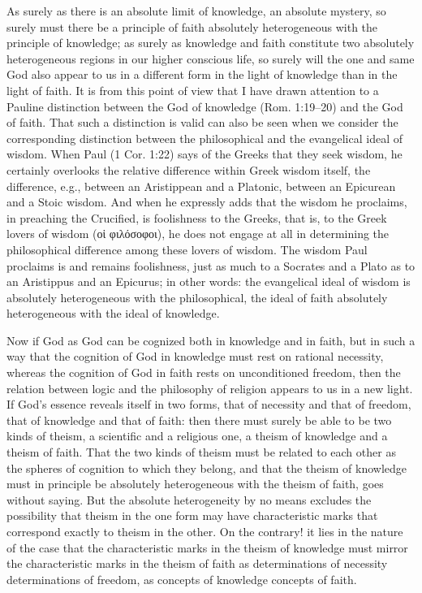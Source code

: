 \documentclass[12pt]{book}
\newcommand{\opage}[1]{\marginnote{\footnotesize\textit{[#1]}}}
\begin{document}
As surely as there is an absolute limit of knowledge, an absolute mystery, so surely must there be a principle of faith
\opage{135}\setcounter{footnote}{0}%
absolutely heterogeneous with the principle of knowledge; as surely as knowledge and faith constitute two absolutely heterogeneous regions in our higher conscious life, so surely will the one and same God also appear to us in a different form in the light of knowledge than in the light of faith. It is from this point of view that I have drawn attention to a Pauline distinction between the God of knowledge (Rom. 1:19--20) and the God of faith. That such a distinction is valid can also be seen when we consider the corresponding distinction between the philosophical and the evangelical ideal of wisdom. When Paul (1 Cor. 1:22) says of the Greeks that they seek wisdom, he certainly overlooks the relative difference within Greek wisdom itself, the difference, e.g., between an Aristippean and a Platonic, between an Epicurean and a Stoic wisdom. And when he expressly adds that the wisdom he proclaims, in preaching the Crucified, is foolishness to the Greeks, that is, to the Greek lovers of wisdom (οἱ φιλόσοφοι), he does not engage at all in determining the philosophical difference among these lovers of wisdom. The wisdom Paul proclaims is and remains foolishness, just as much to a Socrates and a Plato as to an Aristippus and an Epicurus; in other words: the evangelical ideal of wisdom is absolutely heterogeneous with the philosophical, the ideal of faith absolutely heterogeneous with the ideal of knowledge.

Now if God as God can be cognized both in knowledge and in faith, but in such a way that the cognition of God in knowledge must rest on rational necessity, whereas the cognition of God in faith rests on unconditioned freedom, then the relation between logic and the philosophy of religion appears to us in a new light. If God's essence reveals itself in two forms, that of necessity and that of freedom, that of knowledge and that of faith: then there must surely be able to be two kinds of theism, a scientific and a religious one, a theism of knowledge and a theism of faith. That the two kinds of theism must
\opage{136}\setcounter{footnote}{0}%
be related to each other as the spheres of cognition to which they belong, and that the theism of knowledge must in principle be absolutely heterogeneous with the theism of faith, goes without saying. But the absolute heterogeneity by no means excludes the possibility that theism in the one form may have characteristic marks that correspond exactly to theism in the other. On the contrary! it lies in the nature of the case that the characteristic marks in the theism of knowledge must mirror the characteristic marks in the theism of faith as determinations of necessity determinations of freedom, as concepts of knowledge concepts of faith.
\end{document}
